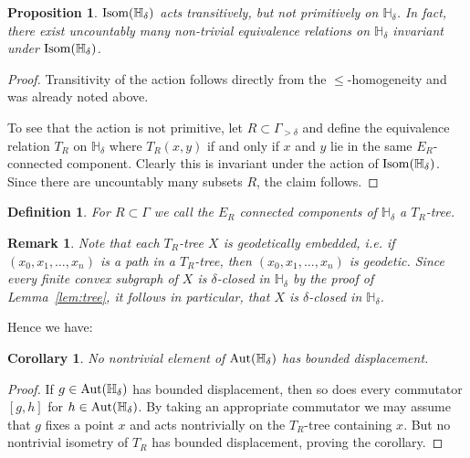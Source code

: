 \documentclass{amsart}
\newcommand{\G}{\Gamma}
\renewcommand{\d}{\delta}
\renewcommand{\H}{\mathbb{H}}
\newtheorem{definition}[defi]{Definition}
\newtheorem{proposition}[defi]{Proposition}
\newtheorem{corollary}[defi]{Corollary}
\newtheorem{remark}[defi]{Remark}
\def\Aut{\mathop{\rm Aut}\nolimits}
\def\Isom{\mathop{\rm Isom}\nolimits}
\begin{document}
\begin{proposition}\label{prop:trans not prim}
$\Isom(\H_\d)$ acts transitively, but not primitively on $\H_\d$. In fact, there exist uncountably many non-trivial equivalence relations on $\H_\d$ invariant under $\Isom(\H_\d)$.
\end{proposition}

\begin{proof}
Transitivity of the action 
follows directly from the $\leq$-homogeneity and was already noted above.

To see that the action is not primitive, let  $R\subset\G_{>\d}$ and define the equivalence relation $T_R$ on $\H_\d$ where $T_R(x,y)$ if and only if $x$ and $y$ lie in the same $E_R$-connected component. Clearly this is invariant under the action of $\Isom(\H_\d)$. Since there are uncountably many subsets $R$, the claim follows.
\end{proof}


\begin{definition}\label{def:T_R}
For $R\subset\G$ we call the $E_R$ connected components of $\H_\d$ a $T_R$-tree.
\end{definition}

\begin{remark}\label{rem: trees are closed}
Note that each $T_R$-tree $X$ is geodetically embedded, i.e. if $(x_0,x_1,\ldots, x_n)$ is a path in a $T_R$-tree, then $(x_0,x_1,\ldots, x_n)$ is geodetic. Since every finite convex subgraph of $X$ is   $\d$-closed in $\H_\d$ by the proof of Lemma~\ref{lem:tree}, it follows in particular, that $X$ is   $\d$-closed in $\H_\d$.
\end{remark}

 Hence we have:


\begin{corollary}\label{cor:no bounded isom}
No nontrivial element of $\Aut(\H_\d)$ has bounded displacement.
\end{corollary}
\begin{proof}
If $g\in\Aut(\H_\d)$ has bounded displacement, then so does every commutator $[g,h]$ for $h\in\Aut(\H_\d)$. By taking an appropriate commutator we may assume that $g$ fixes a point $x$ and acts nontrivially on the $T_R$-tree containing $x$. But no nontrivial isometry of $T_R$ has bounded displacement, proving the corollary.
\end{proof}
\end{document}
